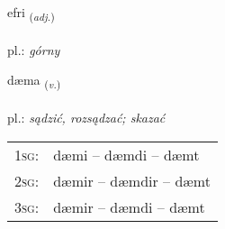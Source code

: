 \documentclass[frontgrid, backgrid]{flacards}\usepackage[]{graphicx}\usepackage[]{xcolor}
\begin{document}
\renewcommand{\flhead}{\vskip5pt \fboxsep=0pt {\small\bfseries\footnotesize Lýsingarorð | przymiotnik}}
\renewcommand{\fcfoot}{\vskip5pt \fboxsep=0pt \hspace{2pt}{\small\bfseries\footnotesize 1K}}

\renewcommand{\blhead}{\vskip5pt {\small\bfseries\footnotesize Lýsingarorð | przymiotnik }}
\renewcommand{\bcfoot}{\vskip5pt \hspace{2pt}{\small\bfseries\footnotesize 1K}}


{efri \small{\textsubscript{(\textit{adj.})}} \\[1ex] %
\textphonetic{[ɛvrɪ]} \\
pl.: \emph{górny} \\  [2ex]
\renewcommand*{\arraystretch}{0.8}
}

\renewcommand{\flhead}{\vskip5pt \fboxsep=0pt {\small\bfseries\footnotesize Sagnorð | czasownik}}
\renewcommand{\fcfoot}{\vskip5pt \fboxsep=0pt \hspace{2pt}{\small\bfseries\footnotesize 1K}}

\renewcommand{\blhead}{\vskip5pt {\small\bfseries\footnotesize Sagnorð | czasownik }}
\renewcommand{\bcfoot}{\vskip5pt \hspace{2pt}{\small\bfseries\footnotesize 1K}}


{dæma \small{\textsubscript{(\textit{v.})}} \\[1ex] %
\textphonetic{[taiːma]} \\
pl.: \emph{sądzić, rozsądzać; skazać} \\  [2ex]
\renewcommand*{\arraystretch}{0.8}
\begin{tabular}{p{1cm}l}
\textsc{1sg}: & dæmi -- dæmdi -- dæmt \\ 
\textsc{2sg}: & dæmir -- dæmdir -- dæmt \\ 
\textsc{3sg}: & dæmir -- dæmdi -- dæmt \\ 
\end{tabular}
}
\end{document}

